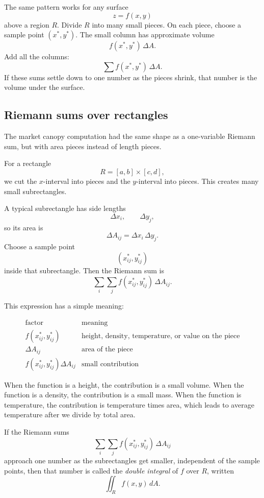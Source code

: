 The same pattern works for any surface
\[
    z=f(x,y)
\]
above a region \(R\).  Divide \(R\) into many small pieces.  On each piece, choose a
sample point \((x^*,y^*)\).  The small column has approximate volume
\[
    f(x^*,y^*)\,\Delta A.
\]
Add all the columns:
\[
    \sum f(x^*,y^*)\,\Delta A.
\]
If these sums settle down to one number as the pieces shrink, that number is the
volume under the surface.

\subsection{Riemann sums over rectangles}

The market canopy computation had the same shape as a one-variable Riemann sum,
but with area pieces instead of length pieces.

For a rectangle
\[
    R=[a,b]\times[c,d],
\]
we cut the \(x\)-interval into pieces and the \(y\)-interval into pieces.  This creates
many small subrectangles.

A typical subrectangle has side lengths
\[
    \Delta x_i,\qquad \Delta y_j,
\]
so its area is
\[
    \Delta A_{ij}=\Delta x_i\,\Delta y_j.
\]
Choose a sample point
\[
    (x_{ij}^*,y_{ij}^*)
\]
inside that subrectangle.  Then the Riemann sum is
\[
\boxed{
    \sum_i\sum_j f(x_{ij}^*,y_{ij}^*)\,\Delta A_{ij}.
}
\]

This expression has a simple meaning:

\[
\begin{array}{c|c}
\text{factor} & \text{meaning} \\ \hline
f(x_{ij}^*,y_{ij}^*) & \text{height, density, temperature, or value on the piece}\\[1mm]
\Delta A_{ij} & \text{area of the piece}\\[1mm]
f(x_{ij}^*,y_{ij}^*)\Delta A_{ij} & \text{small contribution}
\end{array}
\]

When the function is a height, the contribution is a small volume.  When the function
is a density, the contribution is a small mass.  When the function is temperature, the
contribution is temperature times area, which leads to average temperature after we
divide by total area.

\begin{definition}
If the Riemann sums
\[
    \sum_i\sum_j f(x_{ij}^*,y_{ij}^*)\,\Delta A_{ij}
\]
approach one number as the subrectangles get smaller, independent of the sample
points, then that number is called the \emph{double integral} of \(f\) over \(R\), written
\[
\boxed{
    \iint_R f(x,y)\,dA.
}
\]
\end{definition}

